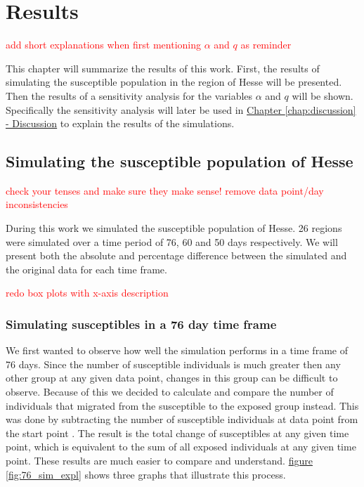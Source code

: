 
\chapter{Results} %
\textcolor{red}{add short explanations when first mentioning $\alpha$ and $q$ as reminder}

\label{chap:results} %
This chapter will summarize the results of this work. First, the results of simulating the susceptible population
in the region of Hesse will be presented. Then the results of a sensitivity analysis for the variables $\alpha$ and
$q$ will be shown. Specifically the sensitivity analysis will later be used in \hyperref[chap:discussion]{Chapter
\ref*{chap:discussion} - Discussion} to explain the results of the simulations.



\section{Simulating the susceptible population of Hesse}
\textcolor{red}{check your tenses and make sure they make sense!}
\textcolor{red}{remove data point/day inconsistencies}

During this work we simulated the susceptible population of Hesse. 26 regions were simulated over a time period of
76, 60 and 50 days respectively. We will present both the absolute and percentage difference between the simulated
and the original data for each time frame.

\textcolor{red}{redo box plots with x-axis description}

\subsection{Simulating susceptibles in a 76 day time frame}
We first wanted to observe how well the simulation performs in a time frame of 76 days. Since the number of susceptible
individuals is much greater then any other group at any given data point, changes in this group can be difficult to
observe. Because of this we decided to calculate and compare the number of individuals that migrated from the susceptible
to the exposed group instead. This was done by subtracting the number of susceptible individuals at data point  from
the start point . The result is the total change of susceptibles at any given time point, which is equivalent to the 
sum of all exposed individuals at any given time point. These results are much easier to compare and understand.
\hyperref[fig:76_sim_expl]{figure \ref*{fig:76_sim_expl}} shows three graphs that illustrate this process.


